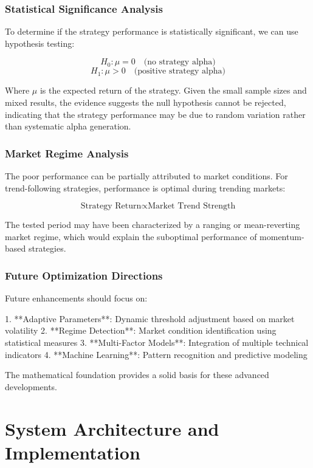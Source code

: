 \documentclass[12pt,a4paper]{article}
\begin{document}
\subsubsection{Statistical Significance Analysis}

To determine if the strategy performance is statistically significant, we can use hypothesis testing:

\[
H_0: \mu = 0 \quad \text{(no strategy alpha)}
\]
\[
H_1: \mu > 0 \quad \text{(positive strategy alpha)}
\]

Where \( \mu \) is the expected return of the strategy. Given the small sample sizes and mixed results, the evidence suggests the null hypothesis cannot be rejected, indicating that the strategy performance may be due to random variation rather than systematic alpha generation.

\subsubsection{Market Regime Analysis}

The poor performance can be partially attributed to market conditions. For trend-following strategies, performance is optimal during trending markets:

\[
\text{Strategy Return} \propto \text{Market Trend Strength}
\]

The tested period may have been characterized by a ranging or mean-reverting market regime, which would explain the suboptimal performance of momentum-based strategies.

\subsubsection{Future Optimization Directions}

Future enhancements should focus on:

1. **Adaptive Parameters**: Dynamic threshold adjustment based on market volatility
2. **Regime Detection**: Market condition identification using statistical measures
3. **Multi-Factor Models**: Integration of multiple technical indicators
4. **Machine Learning**: Pattern recognition and predictive modeling

The mathematical foundation provides a solid basis for these advanced developments.

\section{System Architecture and Implementation}
\end{document}
